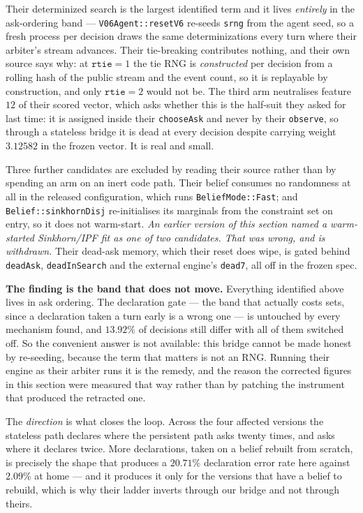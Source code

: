 \documentclass[11pt,letterpaper]{article}
\begin{document}
\noindent Their determinized search is the largest identified term and it lives
\emph{entirely} in the ask-ordering band --- \texttt{V06Agent::resetV6}
re-seeds \texttt{srng} from the agent seed, so a fresh process per decision
draws the same determinizations every turn where their arbiter's stream
advances. Their tie-breaking contributes nothing, and their own source says
why: at $\mathtt{rtie}{=}1$ the tie RNG is \emph{constructed} per decision from
a rolling hash of the public stream and the event count, so it is replayable by
construction, and only $\mathtt{rtie}{=}2$ would not be. The third arm
neutralises feature $12$ of their scored vector, which asks whether this is the
half-suit they asked for last time: it is assigned inside their
\texttt{chooseAsk} and never by their \texttt{observe}, so through a stateless
bridge it is dead at every decision despite carrying weight $3.12582$ in the
frozen vector. It is real and small.

Three further candidates are excluded by reading their source rather than by
spending an arm on an inert code path. Their belief consumes no randomness at
all in the released configuration, which runs \texttt{BeliefMode::Fast}; and
\texttt{Belief::sinkhornDisj} re-initialises its marginals from the constraint
set on entry, so it does not warm-start. \emph{An earlier version of this
section named a warm-started Sinkhorn/IPF fit as one of two candidates. That
was wrong, and is withdrawn.} Their dead-ask memory, which their reset does
wipe, is gated behind \texttt{deadAsk}, \texttt{deadInSearch} and the external engine's
\texttt{dead7}, all off in the frozen spec.

\textbf{The finding is the band that does not move.} Everything identified
above lives in ask ordering. The declaration gate --- the band that actually
costs sets, since a declaration taken a turn early is a wrong one --- is
untouched by every mechanism found, and $13.92\%$ of decisions still differ
with all of them switched off. So the convenient answer is not available: this
bridge cannot be made honest by re-seeding, because the term that matters is
not an RNG. Running their engine as their arbiter runs it is the remedy, and
the reason the corrected figures in this section were measured that way rather
than by patching the instrument that produced the retracted one.

The \emph{direction} is what closes the loop. Across the four affected versions
the stateless path declares where the persistent path asks twenty times, and
asks where it declares twice. More declarations, taken on a belief rebuilt from
scratch, is precisely the shape that produces a $20.71\%$ declaration error rate
here against $2.09\%$ at home --- and it produces it only for the versions that
have a belief to rebuild, which is why their ladder inverts through our bridge
and not through theirs.
\end{document}
